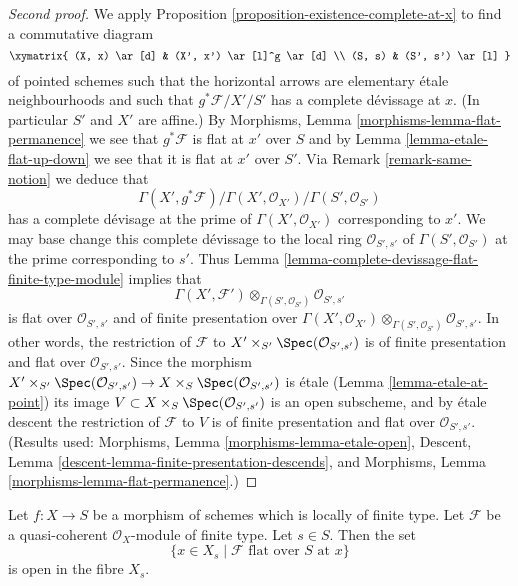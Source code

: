\begin{proof}[Second proof]
We apply
Proposition \ref{proposition-existence-complete-at-x}
to find a commutative diagram
$$
\xymatrix{
(X, x) \ar[d] & (X', x') \ar[l]^g \ar[d] \\
(S, s) & (S', s') \ar[l]
}
$$
of pointed schemes such that the horizontal
arrows are elementary \'etale neighbourhoods
and such that $g^*\mathcal{F}/X'/S'$ has a complete
d\'evissage at $x$.
(In particular $S'$ and $X'$ are affine.) By
Morphisms, Lemma \ref{morphisms-lemma-flat-permanence}
we see that $g^*\mathcal{F}$ is flat at $x'$ over $S$ and by
Lemma \ref{lemma-etale-flat-up-down}
we see that it is flat at $x'$ over $S'$. Via
Remark \ref{remark-same-notion}
we deduce that
$$
\Gamma(X', g^*\mathcal{F})/
\Gamma(X', \mathcal{O}_{X'})/
\Gamma(S', \mathcal{O}_{S'})
$$
has a complete d\'evisage at the prime of $\Gamma(X', \mathcal{O}_{X'})$
corresponding to $x'$. We may base change this complete
d\'evissage to the local ring $\mathcal{O}_{S', s'}$
of $\Gamma(S', \mathcal{O}_{S'})$ at the prime corresponding to
$s'$. Thus
Lemma \ref{lemma-complete-devissage-flat-finite-type-module}
implies that
$$
\Gamma(X', \mathcal{F}')
\otimes_{\Gamma(S', \mathcal{O}_{S'})}
\mathcal{O}_{S', s'}
$$
is flat over $\mathcal{O}_{S', s'}$ and of finite presentation over
$\Gamma(X', \mathcal{O}_{X'})
\otimes_{\Gamma(S', \mathcal{O}_{S'})} \mathcal{O}_{S', s'}$.
In other words, the restriction of $\mathcal{F}$ to
$X' \times_{S'} \Spec(\mathcal{O}_{S', s'})$
is of finite presentation and flat over $\mathcal{O}_{S', s'}$.
Since the morphism
$X' \times_{S'} \Spec(\mathcal{O}_{S', s'})
\to X \times_S \Spec(\mathcal{O}_{S', s'})$
is \'etale
(Lemma \ref{lemma-etale-at-point})
its image $V \subset X \times_S \Spec(\mathcal{O}_{S', s'})$
is an open subscheme, and by \'etale descent the restriction
of $\mathcal{F}$ to $V$ is of finite presentation and flat over
$\mathcal{O}_{S', s'}$. (Results used:
Morphisms, Lemma \ref{morphisms-lemma-etale-open},
Descent, Lemma \ref{descent-lemma-finite-presentation-descends}, and
Morphisms, Lemma \ref{morphisms-lemma-flat-permanence}.)
\end{proof}

\begin{lemma}
\label{lemma-open-in-fibre-where-flat}
Let $f : X \to S$ be a morphism of schemes which is locally of finite type.
Let $\mathcal{F}$ be a quasi-coherent $\mathcal{O}_X$-module of finite type.
Let $s \in S$. Then the set
$$
\{x \in X_s \mid \mathcal{F} \text{ flat over }S\text{ at }x\}
$$
is open in the fibre $X_s$.
\end{lemma}

